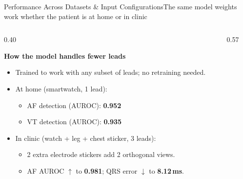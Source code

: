 \documentclass[aspectratio=169,10pt]{beamer}
\begin{document}
\begin{frame}{Performance Across Datasets \& Input Configurations}{The same model weights work whether the patient is at home or in clinic}
\begin{columns}[T]
  \begin{column}{0.40\textwidth}
    \begin{block}{\textbf{How the model handles fewer leads}}
      \scriptsize
      \begin{itemize}
        \setlength{\itemsep}{0.15em}
        \item Trained to work with any subset of leads; no retraining needed.
        \item At home (smartwatch, 1 lead):
          \begin{itemize}
            \tiny
            \setlength{\itemsep}{0.1em}
            \item AF detection (AUROC): \textbf{0.952}
            \item VT detection (AUROC): \textbf{0.935}
          \end{itemize}
        \item In clinic (watch + leg + chest sticker, 3 leads):
          \begin{itemize}
            \tiny
            \setlength{\itemsep}{0.1em}
            \item 2 extra electrode stickers add 2 orthogonal views.
            \item AF AUROC $\uparrow$ to \textbf{0.981}; QRS error $\downarrow$ to \textbf{8.12\,ms}.
          \end{itemize}
      \end{itemize}
    \end{block}
  \end{column}
  \begin{column}{0.57\textwidth}
    \begin{table}[h]
    \centering
\end{table}
\end{column}
\end{columns}
\end{frame}
\end{document}

